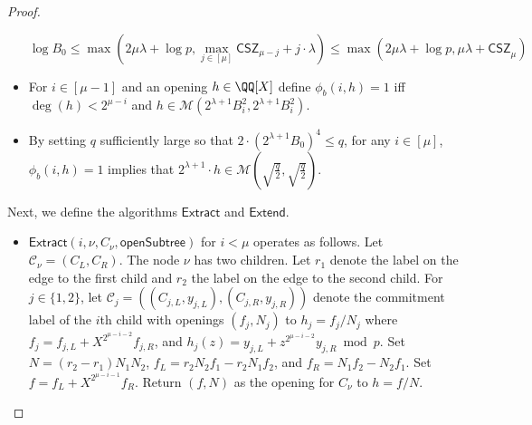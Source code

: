 \begin{proof}
\begin{itemize}
$$ \log B_0 \leq \max(2\mu \lambda + \log p, \max_{j \in [\mu]} \mathsf{CSZ}_{\mu - j} + j \cdot \lambda ) \leq \max(2\mu \lambda + \log p, \mathsf{\mu \lambda + CSZ}_\mu)$$
\fi 

\item For $i \in [\mu-1]$ and an opening $h \in \QQ[X]$ define $\phi_b(i, h) = 1$ iff $\deg(h) < 2^{\mu - i}$ and $h \in \mathcal{M}(2^{\lambda + 1} B_i^2, 2^{\lambda + 1} B_i^2)$. 

 \item By setting $q$ sufficiently large so that $2 \cdot (2^{\lambda + 1} B_0)^4 \leq  q$, for any $i \in [\mu]$, $\phi_b(i, h) = 1$ implies that $2^{\lambda + 1} \cdot h \in \mathcal{M}(\sqrt{\frac{q}{2}},\sqrt{\frac{q}{2}})$.  
\end{itemize} 

Next, we define the algorithms $\textsf{Extract}$ and $\textsf{Extend}$. 

\begin{itemize} 
\item $\textsf{Extract}(i, \nu, C_\nu, \textsf{openSubtree})$ for $i < \mu$ operates as follows. Let $\mathcal{C}_\nu = (C_L, C_R)$. The node $\nu$ has two children. Let $r_1$ denote the label on the edge to the first child and $r_2$ the label on the edge to the second child. For $j \in \{1,2\}$, let $\mathcal{C}_j = ((C_{j,L}, y_{j, L}), (C_{j,R}, y_{j,R}))$ denote the commitment label of the $i$th child with openings $(f_j, N_j)$ to $h_j = f_j/N_j$ where $f_j = f_{j, L} + X^{2^{\mu - i - 2}} f_{j, R}$, and $h_j(z) = y_{j,L} + z^{2^{\mu - i -2}} y_{j,R} \bmod p$. Set $N = (r_2 - r_1) N_1 N_2$, $f_L = r_2 N_2 f_1 - r_2 N_1 f_2$, and $f_R = N_1 f_2 - N_2 f_1$. Set $f = f_L + X^{2^{\mu - i -1}} f_R$. Return $(f, N)$ as the opening for $C_\nu$ to $h = f/N$. 





\end{itemize}
\end{proof}
